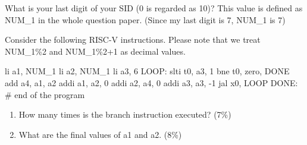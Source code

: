\documentclass[12pt, a4paper]{article}
\begin{document}
\noindent What is your last digit of your SID (0 is regarded as 10)? This value is defined as
NUM\_1 in the whole question paper. (Since my last digit is 7, NUM\_1 is 7)\\

\begin{q}{15}
Consider the following RISC-V instructions. Please note that we treat 
NUM\_1\%2 and NUM\_1\%2+1 as decimal values.
\begin{code}
    li a1, NUM_1%
    li a2, NUM_1%
    li a3, 6
    LOOP:
    slti t0, a3, 1
    bne t0, zero, DONE
    add a4, a1, a2
    addi a1, a2, 0
    addi a2, a4, 0
    addi a3, a3, -1
    jal x0, LOOP
    DONE:
    # end of the program
\end{code}
\begin{enumerate}
    \item How many times is the branch instruction executed? (7\%)
    \item What are the final values of a1 and a2. (8\%)
\end{enumerate}
\end{q}
\end{document}
